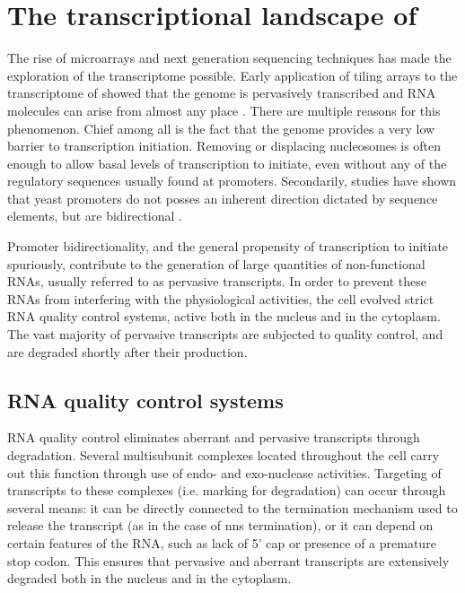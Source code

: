 \section{The transcriptional landscape of \cer{}} %

The rise of microarrays and next generation sequencing techniques has made the exploration of the transcriptome possible. 
Early application of tiling arrays to the transcriptome of \cer{} showed that the genome is pervasively transcribed and RNA molecules can arise from almost any place \cite{neil:2009:widespread,xu:2009:bidirectional}. 
There are multiple reasons for this phenomenon.
Chief among all is the fact that the genome provides a very low barrier to transcription initiation.
Removing or displacing nucleosomes is often enough to allow basal levels of transcription to initiate, even without any of the regulatory sequences usually found at promoters.
Secondarily, studies have shown that yeast promoters do not posses an inherent direction dictated by sequence elements, but are bidirectional \cite{neil:2009:widespread,xu:2009:bidirectional}.

Promoter bidirectionality, and the general propensity of transcription to initiate spuriously, contribute to the generation of large quantities of non-functional RNAs, usually referred to as pervasive transcripts.
In order to prevent these RNAs from interfering with the physiological activities, the cell evolved strict RNA quality control systems, active both in the nucleus and in the cytoplasm.
The vast majority of pervasive transcripts are subjected to quality control, and are degraded shortly after their production.

\subsection{RNA quality control systems}

RNA quality control eliminates aberrant and pervasive transcripts through degradation.
Several multisubunit complexes located throughout the cell carry out this function through use of endo- and exo-nuclease activities.
Targeting of transcripts to these complexes (i.e. marking for degradation) can occur through several means: it can be directly connected to the termination mechanism used to release the transcript (as in the case of \gls{nns} termination), or it can depend on certain features of the RNA, such as lack of 5' cap or presence of a premature stop codon.
This ensures that pervasive and aberrant transcripts are extensively degraded both in the nucleus and in the cytoplasm.

